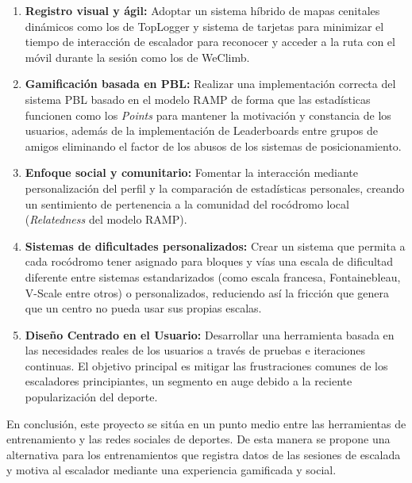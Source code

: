 \begin{enumerate}
\item \textbf{Registro visual y ágil:} Adoptar un sistema híbrido de mapas cenitales dinámicos como los de TopLogger y sistema de tarjetas para minimizar el tiempo de interacción de escalador para reconocer y acceder a la ruta con el móvil durante la sesión como los de WeClimb.
\item \textbf{Gamificación basada en PBL:} Realizar una implementación correcta del sistema PBL basado en el modelo RAMP de forma que las estadísticas funcionen como los \textit{Points} para mantener la motivación y constancia de los usuarios, además de la implementación de Leaderboards entre grupos de amigos eliminando el factor de los abusos de los sistemas de posicionamiento.
\item \textbf{Enfoque social y comunitario:} Fomentar la interacción mediante personalización del perfil y la comparación de estadísticas personales, creando un sentimiento de pertenencia a la comunidad del rocódromo local (\textit{Relatedness} del modelo RAMP).
\item \textbf{Sistemas de dificultades personalizados:} Crear un sistema que permita a cada rocódromo tener asignado para bloques y vías una escala de dificultad diferente entre sistemas estandarizados (como escala francesa, Fontainebleau, V-Scale entre otros) o personalizados, reduciendo así la fricción que genera que un centro no pueda usar sus propias escalas.
\item \textbf{Diseño Centrado en el Usuario:} Desarrollar una herramienta basada en las necesidades reales de los usuarios a través de pruebas e iteraciones continuas. El objetivo principal es mitigar las frustraciones comunes de los escaladores principiantes, un segmento en auge debido a la reciente popularización del deporte.
\end{enumerate}

En conclusión, este proyecto se sitúa en un punto medio entre las herramientas de entrenamiento y las redes sociales de deportes. De esta manera se propone una alternativa para los entrenamientos que registra datos de las sesiones de escalada y motiva al escalador mediante una experiencia gamificada y social.